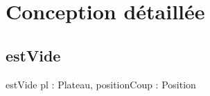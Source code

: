 \section{Conception détaillée}
    \subsection{estVide}
        \begin{algorithme}
            \fonction
                {estVide}
                {pl : Plateau, positionCoup : Position}
                {\booleen}
                {}
                {}
        \end{algorithme}
            
